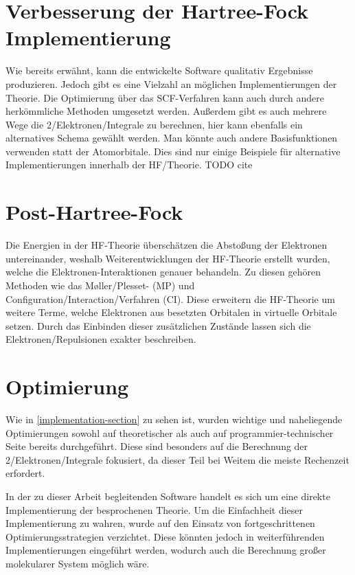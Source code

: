 \section{Verbesserung der Hartree-Fock Implementierung}
Wie bereits erwähnt, kann die entwickelte Software qualitativ
Ergebnisse produzieren. Jedoch gibt es eine Vielzahl an
möglichen Implementierungen der Theorie.
Die Optimierung über das SCF-Verfahren kann auch durch
andere herkömmliche Methoden umgesetzt werden. Außerdem gibt
es auch mehrere Wege die 2\-/Elektronen\-/Integrale zu berechnen,
hier kann ebenfalls ein alternatives Schema gewählt werden.
Man könnte auch andere Basisfunktionen verwenden statt der Atomorbitale.
Dies sind nur einige Beispiele für alternative Implementierungen
innerhalb der HF\-/Theorie. TODO cite

\section{Post-Hartree-Fock}
Die Energien in der HF-Theorie überschätzen die Abstoßung der Elektronen untereinander,
weshalb Weiterentwicklungen der HF-Theorie erstellt wurden,
welche die Elektronen-Interaktionen genauer behandeln.
Zu diesen gehören Methoden wie das Møller\-/Plesset- (MP)
und Configuration\-/Interaction\-/Verfahren (CI).
Diese erweitern die HF-Theorie um weitere Terme,
welche Elektronen aus besetzten Orbitalen in virtuelle Orbitale setzen.
Durch das Einbinden dieser zusätzlichen Zustände lassen
sich die Elektronen\-/Repulsionen exakter beschreiben.

\cite[S. 3]{tc2_phf}
\cite[5.4.2, 5.4.3]{lewars_2016}

\section{Optimierung}
Wie in \cref{implementation-section} zu sehen ist,
wurden wichtige und naheliegende Optimierungen
sowohl auf theoretischer als auch auf programmier-technischer Seite bereits durchgeführt.
Diese sind besonders auf die Berechnung der 2\-/Elektronen\-/Integrale fokusiert,
da dieser Teil bei Weitem die meiste Rechenzeit erfordert.

In der zu dieser Arbeit begleitenden Software handelt es sich
um eine direkte Implementierung der besprochenen Theorie.
Um die Einfachheit dieser Implementierung zu wahren, wurde auf den Einsatz von
fortgeschrittenen Optimierungsstrategien verzichtet.
Diese könnten jedoch in weiterführenden Implementierungen eingeführt werden,
wodurch auch die Berechnung großer molekularer System möglich wäre.

